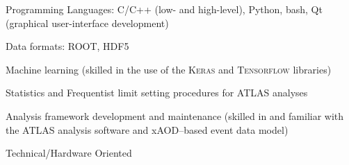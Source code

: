 \begin{minipage}{0.8\textwidth}
\begin{minipage}{\textwidth}
\hspace{0.2in}
\begin{minipage}{0.8\textwidth}

    \vspace{0.1in}
    \hspace{0.15in}
    \begin{minipage}{\textwidth}
    Programming Languages: C/C++ (low- and high-level), Python, bash, Qt (graphical user-interface development)
    \end{minipage}


    \vspace{0.1in}
    \hspace{0.15in}
    \begin{minipage}{\textwidth}
    Data formats: ROOT, HDF5
    \end{minipage}

    \vspace{0.1in}
	\hspace{0.15in}
	\begin{minipage}{\textwidth}
	Machine learning (skilled in the use of the \textsc{Keras} and \textsc{Tensorflow} libraries)
    \end{minipage}

	\vspace{0.1in}
	\hspace{0.15in}
    \begin{minipage}{\textwidth}
	Statistics and Frequentist limit setting procedures for ATLAS analyses
    \end{minipage}

	\vspace{0.1in}
	\hspace{0.15in}
    \begin{minipage}{\textwidth}
	Analysis framework development and maintenance (skilled in and familiar with the ATLAS analysis software and xAOD--based event data model)
    \end{minipage}

    \vspace{0.1in}
    \hspace{0.15in}
    \begin{minipage}{\textwidth}
    \end{minipage}

\end{minipage}

\hspace{0.2in}
Technical/Hardware Oriented

\vspace{0.1in}
\hspace{0.2in}
\begin{minipage}{0.8\textwidth}



\end{minipage}
\end{minipage}
\end{minipage}
